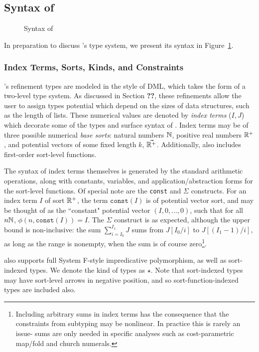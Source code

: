 \subsection{Syntax of \dlambdaamor}
\begin{figure}

\caption{Syntax of \dlambdaamor}
\label{fig:dlambdaamor-syntax}
\end{figure}

In preparation to discuss \dlambdaamor's type system, we present its syntax in Figure~\ref{fig:dlambdaamor-syntax}.

\subsubsection{Index Terms, Sorts, Kinds, and Constraints}
\dlambdaamor's refinement types are modeled in the style of DML, which takes the form of a two-level type system. As discussed in Section \textbf{??}, these refinements allow the user to assign types potential which depend on the sizes of data structures, such as the length of lists. These numerical values are denoted by \textit{index terms} ($I,J$) which decorate some of the types and surface syntax of \dlambdaamor. Index terms may be of three possible numerical \textit{base sorts}: natural numbers $\mathbb{N}$, positive real numbers $\mathbb{R}^+$, and potential vectors of some fixed length $k$, $\vec{\mathbb{R}^+}$. Additionally, \dlambdaamor also includes first-order sort-level functions.

The syntax of index terms themselves is generated by the standard arithmetic operations, along with constants, variables, and application/abstraction forms for the sort-level functions. Of special note are the \texttt{const} and $\Sigma$ constructs. For an index term $I$ of sort $\mathbb{R}^+$, the term $\texttt{const}(I)$ is of potential vector sort, and may be thought of as the ``constant" potential vector $(I,0,\dots,0)$, such that for all $n \mathbb{N}$, $\phi(n,\texttt{const}(I)) = I$.
The $\Sigma$ construct is as expected, although the upper bound is non-inclusive: the sum $\sum_{i=I_0}^{I_1} J$ sums from $J[I_0/i]$ to $J[(I_1-1)/i]$, as long as the range is nonempty, when the sum is of course zero\footnote{
Including arbitrary sums in index terms has the consequence that the constraints from subtyping may be nonlinear. In practice this is rarely an issue- sums are only needed in specific analyses such as cost-parametric map/fold and church numerals.
}.

\dlambdaamor also supports full System F-style impredicative polymorphism, as well as sort-indexed types. We denote the kind of types as $\star$. Note that sort-indexed types may have sort-level arrows in negative position, and so sort-function-indexed types are included also.

